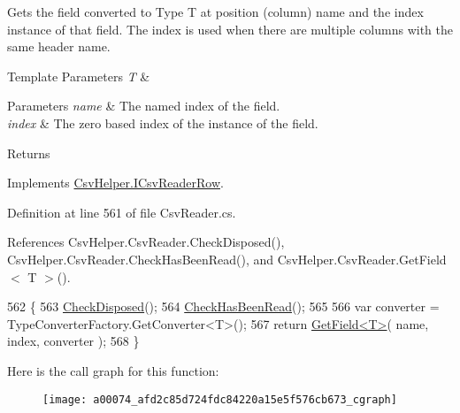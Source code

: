Gets the field converted to Type T at position (column) name and the index instance of that field. The index is used when there are multiple columns with the same header name. 


\begin{DoxyTemplParams}{Template Parameters}
{\em T} & \\
\hline
\end{DoxyTemplParams}

\begin{DoxyParams}{Parameters}
{\em name} & The named index of the field.\\
\hline
{\em index} & The zero based index of the instance of the field.\\
\hline
\end{DoxyParams}
\begin{DoxyReturn}{Returns}

\end{DoxyReturn}


Implements \hyperlink{a00110_aa8c349da18823eb8c30911d891b3e3bc}{Csv\-Helper.\-I\-Csv\-Reader\-Row}.



Definition at line 561 of file Csv\-Reader.\-cs.



References Csv\-Helper.\-Csv\-Reader.\-Check\-Disposed(), Csv\-Helper.\-Csv\-Reader.\-Check\-Has\-Been\-Read(), and Csv\-Helper.\-Csv\-Reader.\-Get\-Field$<$ T $>$().


\begin{DoxyCode}
562         \{
563             \hyperlink{a00074_a6fa45a46ed1322dc1872ca2321b5edbc}{CheckDisposed}();
564             \hyperlink{a00074_a2d9249171ed1568e45d152766d364c31}{CheckHasBeenRead}();
565 
566             var converter = TypeConverterFactory.GetConverter<T>();
567             \textcolor{keywordflow}{return} \hyperlink{a00074_a6a43cfaf39caea93ecd87e506be7b404}{GetField<T>}( name, index, converter );
568         \}
\end{DoxyCode}


Here is the call graph for this function\-:
\nopagebreak
\begin{figure}[H]
\begin{center}
\leavevmode
\texttt{[image: a00074\_afd2c85d724fdc84220a15e5f576cb673\_cgraph]}
\end{center}
\end{figure}


